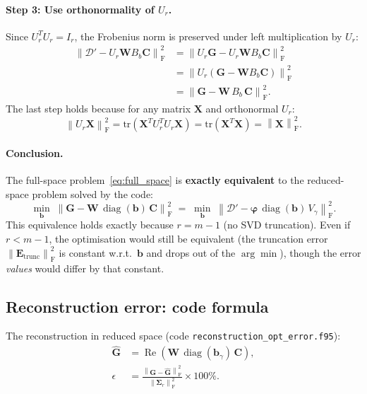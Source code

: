 \documentclass[11pt,a4paper]{article}
\newcommand{\norm}[1]{\left\lVert #1 \right\rVert}
\newcommand{\Fro}{\mathrm{F}}
\newcommand{\diag}{\operatorname{diag}}
\newcommand{\Reop}{\operatorname{Re}}
\newcommand{\Sigmat}{\bm{\Sigma}}
\begin{document}
\paragraph{Step 3: Use orthonormality of $U_r$.}

Since $U_r^T U_r = I_r$, the Frobenius norm is preserved under left multiplication by $U_r$:
\begin{align}
\norm{\mathcal{D}' - U_r \bm{W} B_b \bm{C}}_\Fro^2
&= \norm{U_r \bm{G} - U_r \bm{W} B_b \bm{C}}_\Fro^2 \nonumber\\
&= \norm{U_r \left(\bm{G} - \bm{W} B_b \bm{C}\right)}_\Fro^2 \nonumber\\
&= \norm{\bm{G} - \bm{W}\, B_b\, \bm{C}}_\Fro^2. \label{eq:reduced_equiv}
\end{align}
The last step holds because for any matrix $\bm{X}$ and orthonormal $U_r$:
\[
\norm{U_r \bm{X}}_\Fro^2 = \mathrm{tr}\!\left(\bm{X}^T U_r^T U_r \bm{X}\right) = \mathrm{tr}\!\left(\bm{X}^T \bm{X}\right) = \norm{\bm{X}}_\Fro^2.
\]

\paragraph{Conclusion.}  The full-space problem~\eqref{eq:full_space} is \textbf{exactly equivalent} to the reduced-space problem solved by the code:
\begin{equation}\label{eq:reduced_space}
\boxed{\min_{\bm{b}} \;\norm{\bm{G} - \bm{W}\,\diag(\bm{b})\,\bm{C}}_\Fro^2
\;=\; \min_{\bm{b}} \;\norm{\mathcal{D}' - \bm{\varphi}\,\diag(\bm{b})\,V_\gamma}_\Fro^2.}
\end{equation}
This equivalence holds exactly because $r = m{-}1$ (no SVD truncation).  Even if $r < m{-}1$, the optimisation would still be equivalent (the truncation error $\norm{\bm{E}_{\mathrm{trunc}}}_\Fro^2$ is constant w.r.t.\ $\bm{b}$ and drops out of the $\arg\min$), though the error \emph{values} would differ by that constant.


\subsection{Reconstruction error: code formula}
\label{sec:error_code}

The reconstruction in reduced space (code \texttt{reconstruction\_opt\_error.f95}):
\begin{align}
\hat{\bm{G}} &= \Reop\!\left(\bm{W}\,\diag(\bm{b}_\gamma)\,\bm{C}\right), \\[4pt]
\epsilon &= \frac{\norm{\bm{G} - \hat{\bm{G}}}_\Fro^2}{\norm{\Sigmat_r}_\Fro^2} \times 100\%.
\end{align}
\end{document}
